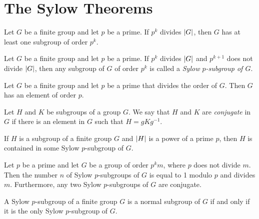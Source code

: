\section{The Sylow Theorems}

\begin{theorem}
	Let $G$ be a finite group and let $p$ be a prime. If $p^k$ divides $\left\lvert G \right\rvert$, then $G$ has at least one subgroup of order $p^k$.
\end{theorem}

\begin{definition}
	Let $G$ be a finite group and let $p$ be a prime. If $p^k$ divides $\left\lvert G \right\rvert$ and $p^{k+1}$ does not divide $\left\lvert G \right\rvert$, then any subgroup of $G$ of order $p^k$ is called a \textit{Sylow $p$-subgroup of $G$}.
\end{definition}

\begin{corollary}
	Let $G$ be a finite group and let $p$ be a prime that divides the order of $G$. Then $G$ has an element of order $p$.
\end{corollary}

\begin{definition}
	Let $H$ and $K$ be subgroups of a group $G$. We say that $H$ and $K$ are \textit{conjugate} in $G$ if there is an element in $G$ such that $H = gKg^{-1}$.
\end{definition}

\begin{theorem}
	If $H$ is a subgroup of a finite group $G$ and $\left\lvert H \right\rvert$ is a power of a prime $p$, then $H$ is contained in some Sylow $p$-subgroup of $G$.
\end{theorem}

\begin{theorem}
	Let $p$ be a prime and let $G$ be a group of order $p^km$, where $p$ does not divide $m$. Then the number $n$ of Sylow $p$-subgroups of $G$ is equal to 1 modulo $p$ and divides $m$. Furthermore, any two Sylow $p$-subgroups of $G$ are conjugate.
\end{theorem}

\begin{corollary}
	A Sylow $p$-subgroup of a finite group $G$ is a normal subgroup of $G$ if and only if it is the only Sylow $p$-subgroup of $G$.
\end{corollary}
